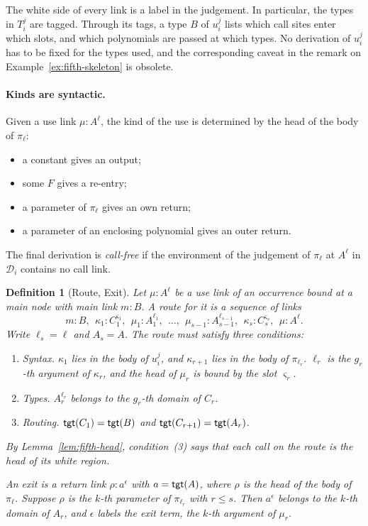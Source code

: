 \documentclass[10pt,a4paper]{article}
\theoremstyle{plain}%
\newtheorem{definition}[theorem]{Definition}
\begin{document}
The white side of every link is a label in the judgement.
In particular, the types in $T_i^j$ are tagged.
Through its tags, a type $B$ of $u_i^j$ lists which call sites enter which slots, and which polynomials are passed at which types.
No derivation of $u_i^j$ has to be fixed for the types used, and the corresponding caveat in the remark on Example~\ref{ex:fifth-skeleton} is obsolete.

\paragraph{Kinds are syntactic.}
Given a use link $\mu : A^\ell$, the kind of the use is determined by the head of the body of $\pi_\ell$:
\begin{itemize}
\item a constant gives an output;
\item some $F$ gives a re-entry;
\item a parameter of $\pi_\ell$ gives an own return;
\item a parameter of an enclosing polynomial gives an outer return.
\end{itemize}
The final derivation is \emph{call-free} if the environment of the judgement of $\pi_\ell$ at $A^\ell$ in $\mathcal{D}_i$ contains no call link.

\begin{definition}[Route, Exit]
Let $\mu : A^\ell$ be a use link of an occurrence bound at a main node with main link $m : B$.
A \emph{route} for it is a sequence of links
\[
m : B,\ \ \kappa_1 : C_1^{\varsigma_1},\ \ \mu_1 : A_1^{\ell_1},\ \ \ldots,\ \ \mu_{s-1} : A_{s-1}^{\ell_{s-1}},\ \ \kappa_s : C_s^{\varsigma_s},\ \ \mu : A^\ell .
\]
Write $\ell_s = \ell$ and $A_s = A$.
The route must satisfy three conditions:
\begin{enumerate}
\item \emph{Syntax.}
$\kappa_1$ lies in the body of $u_i^j$, and $\kappa_{r+1}$ lies in the body of $\pi_{\ell_r}$.
$\ell_r$ is the $g_r$-th argument of $\kappa_r$, and the head of $\mu_r$ is bound by the slot $\varsigma_r$.
\item \emph{Types.}
$A_r^{\ell_r}$ belongs to the $g_r$-th domain of $C_r$.
\item \emph{Routing.}
$\mathsf{tgt}(C_1) = \mathsf{tgt}(B)$ and $\mathsf{tgt}(C_{r+1}) = \mathsf{tgt}(A_r)$.
\end{enumerate}
By Lemma~\ref{lem:fifth-head}, condition~(3) says that each call on the route is the head of its white region.

An \emph{exit} is a return link $\rho : a^\epsilon$ with $a = \mathsf{tgt}(A)$, where $\rho$ is the head of the body of $\pi_\ell$.
Suppose $\rho$ is the $k$-th parameter of $\pi_{\ell_r}$ with $r \le s$.
Then $a^\epsilon$ belongs to the $k$-th domain of $A_r$, and $\epsilon$ labels the \emph{exit term}, the $k$-th argument of $\mu_r$.
\end{definition}
\end{document}

